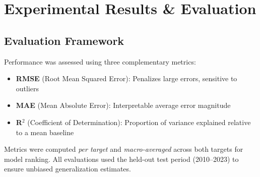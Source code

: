 \documentclass[12pt, a4paper]{article}
\begin{document}
\section{Experimental Results \& Evaluation}

\subsection{Evaluation Framework}
Performance was assessed using three complementary metrics:
\begin{itemize}[leftmargin=*]
    \item \textbf{RMSE} (Root Mean Squared Error): Penalizes large errors, sensitive to outliers
    \item \textbf{MAE} (Mean Absolute Error): Interpretable average error magnitude
    \item \textbf{R$^2$} (Coefficient of Determination): Proportion of variance explained relative to a mean baseline
\end{itemize}
Metrics were computed \textit{per target} and \textit{macro-averaged} across both targets for model ranking. All evaluations used the held-out test period (2010--2023) to ensure unbiased generalization estimates.
\end{document}
